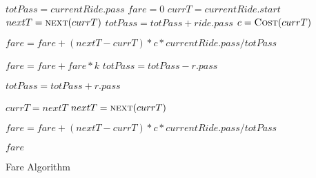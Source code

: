 \begin{algorithm}
\begin{algorithmic}[1]
\State $totPass = currentRide.pass$
\State $fare = 0$
\State $currT = currentRide.start$
\State $nextT = \Call{next}{currT}$ 
 
        \State $totPass = totPass + ride.pass$
    \EndIf
\EndFor
{}
    \State $c = \Call{Cost}{currT}$
    
    \State $fare = fare + (nextT - currT) * c * currentRide.pass / totPass$
    
    \State $fare = fare + fare * k$
        \State $totPass = totPass - r.pass$
    \EndIf
    
        \State $totPass = totPass + r.pass$
    \EndIf
    
    \State $currT = nextT$
    \State $nextT = \Call{next}{currT}$

\EndWhile

\State $fare = fare + (nextT - currT) * c * currentRide.pass / totPass$

\State \Return $fare$

\EndFunction

\end{algorithmic}
\caption{
    \label{alg:reqfare} Fare Algorithm}
\end{algorithm}



\begin{comment}
\For{$ride$ \textbf{in} $otherRides$} \Comment{Ignore Ride ended before the current one started}
    \If{$ride.end < currentRide.start$}
        ride.ignore();
    \EndIf
\EndFor

\end{comment}
